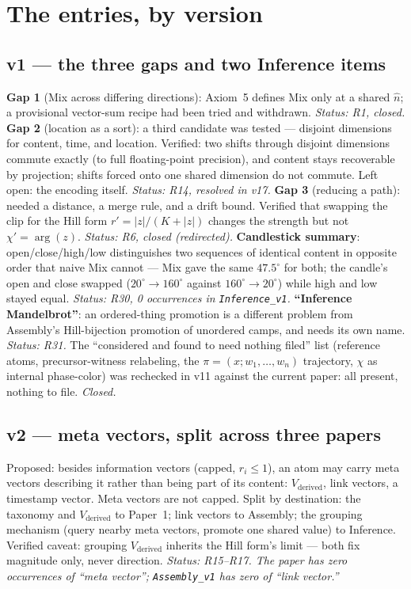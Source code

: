 \documentclass[11pt]{article}
\begin{document}
\section{The entries, by version}

\subsection*{v1 --- the three gaps and two Inference items}
\textbf{Gap 1} (Mix across differing directions): Axiom~5 defines Mix
only at a shared $\hat n$; a provisional vector-sum recipe had been
tried and withdrawn. \emph{Status: R1, closed.}
\textbf{Gap 2} (location as a sort): a third candidate was tested ---
disjoint dimensions for content, time, and location. Verified: two
shifts through disjoint dimensions commute exactly (to full
floating-point precision), and content stays recoverable by
projection; shifts forced onto one shared dimension do not commute.
Left open: the encoding itself. \emph{Status: R14, resolved in v17.}
\textbf{Gap 3} (reducing a path): needed a distance, a merge rule,
and a drift bound. Verified that swapping the clip for the Hill form
$r'=|z|/(K+|z|)$ changes the strength but not $\chi'=\arg(z)$.
\emph{Status: R6, closed (redirected).}
\textbf{Candlestick summary}: open/close/high/low distinguishes two
sequences of identical content in opposite order that naive Mix cannot
--- Mix gave the same $47.5^\circ$ for both; the candle's open and
close swapped ($20^\circ\!\to\!160^\circ$ against
$160^\circ\!\to\!20^\circ$) while high and low stayed equal.
\emph{Status: R30, 0 occurrences in \texttt{Inference\_v1}.}
\textbf{``Inference Mandelbrot''}: an ordered-thing promotion is a
different problem from Assembly's Hill-bijection promotion of
unordered camps, and needs its own name. \emph{Status: R31.}
The ``considered and found to need nothing filed'' list (reference
atoms, precursor-witness relabeling, the $\pi=(x;w_1,\dots,w_n)$
trajectory, $\chi$ as internal phase-color) was rechecked in v11
against the current paper: all present, nothing to file. \emph{Closed.}

\subsection*{v2 --- meta vectors, split across three papers}
Proposed: besides information vectors (capped, $r_i\le1$), an atom
may carry meta vectors describing it rather than being part of its
content: $V_{\text{derived}}$, link vectors, a timestamp vector.
Meta vectors are not capped. Split by destination: the taxonomy and
$V_{\text{derived}}$ to Paper~1; link vectors to Assembly; the
grouping mechanism (query nearby meta vectors, promote one shared
value) to Inference. Verified caveat: grouping $V_{\text{derived}}$
inherits the Hill form's limit --- both fix magnitude only, never
direction. \emph{Status: R15--R17. The paper has zero occurrences of
``meta vector''; \texttt{Assembly\_v1} has zero of ``link vector.''}
\end{document}
